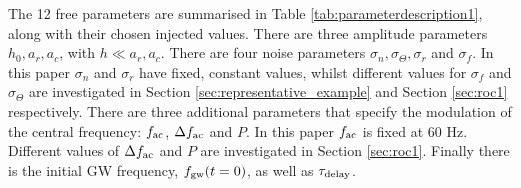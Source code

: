 \documentclass[pra,superscriptaddress,reprint,amsmath,amssymb,nofootinbib]{revtex4-2}
\begin{document}
The 12 free parameters are summarised in Table \ref{tab:parameterdescription1}, along with their chosen injected values. There are three amplitude parameters $h_0, a_r, a_c$, with $h \ll a_r, a_c$. There are four noise parameters $\sigma_n, \sigma_{\Theta}, \sigma_r$ and  $\sigma_f$. In this paper $\sigma_n$ and $\sigma_r$ have fixed, constant values, whilst different values for $\sigma_f$ and $\sigma_{\Theta}$ are investigated in Section \ref{sec:representative_example} and Section \ref{sec:roc1} respectively. There are three additional parameters that specify the modulation of the central frequency: $f_{\rm ac}$, $\Delta f_{\rm ac}$ and $P$. In this paper $f_{\rm ac}$ is fixed at 60 Hz. Different values of $\Delta f_{\rm ac}$ and $P$ are investigated in Section \ref{sec:roc1}. Finally there is the initial GW frequency, $f_{\rm gw}(t=0)$, as well as $\tau_{\rm delay}$.
\end{document}
